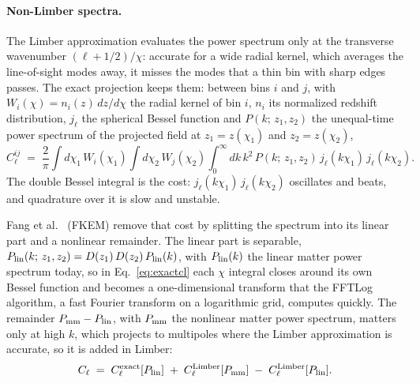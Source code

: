\documentclass[11pt]{article}
\begin{document}
\paragraph{Non-Limber spectra.}
The Limber approximation evaluates the power spectrum only at the
transverse wavenumber $(\ell + 1/2)/\chi$: accurate for a wide radial
kernel, which averages the line-of-sight modes away, it misses the
modes that a thin bin with sharp edges passes.  The
exact projection keeps them: between bins $i$ and
$j$, with $W_i(\chi) = n_i(z)\,dz/d\chi$ the radial kernel of bin $i$,
$n_i$ its normalized redshift distribution, $j_\ell$ the spherical
Bessel function and $P(k;\, z_1, z_2)$ the unequal-time power spectrum
of the projected field at $z_1 = z(\chi_1)$ and $z_2 = z(\chi_2)$,
\begin{equation}
  C_\ell^{ij} \;=\; \frac{2}{\pi} \int d\chi_1\, W_i(\chi_1)
  \int d\chi_2\, W_j(\chi_2)
  \int_0^\infty dk\, k^2\, P(k;\, z_1, z_2)\,
  j_\ell(k\chi_1)\, j_\ell(k\chi_2) .
  \label{eq:exactcl}
\end{equation}
The double Bessel integral is the cost: $j_\ell(k\chi_1)\,
j_\ell(k\chi_2)$ oscillates and beats, and quadrature over it is slow
and unstable.

Fang et al.~\cite{FangKEM2020} (FKEM) remove that cost by splitting
the spectrum into its linear part and a nonlinear remainder.  The
linear part is separable, $P_{\rm lin}(k;\, z_1, z_2) =
D(z_1)\,D(z_2)\,P_{\rm lin}(k)$, with $P_{\rm lin}(k)$ the linear
matter power spectrum today, so in Eq.~\eqref{eq:exactcl} each
$\chi$ integral closes around its own Bessel function and becomes a
one-dimensional transform that the FFTLog algorithm, a fast Fourier
transform on a logarithmic grid, computes quickly.
The remainder $P_{\rm mm} - P_{\rm lin}$, with $P_{\rm mm}$ the
nonlinear matter power spectrum, matters only at high $k$, which
projects to multipoles where the Limber approximation is accurate, so
it is added in Limber:
\begin{equation}
  C_\ell \;=\; C_\ell^{\rm exact}[P_{\rm lin}]
  \;+\; C_\ell^{\rm Limber}[P_{\rm mm}]
  \;-\; C_\ell^{\rm Limber}[P_{\rm lin}] .
  \label{eq:fkem}
\end{equation}
\end{document}
